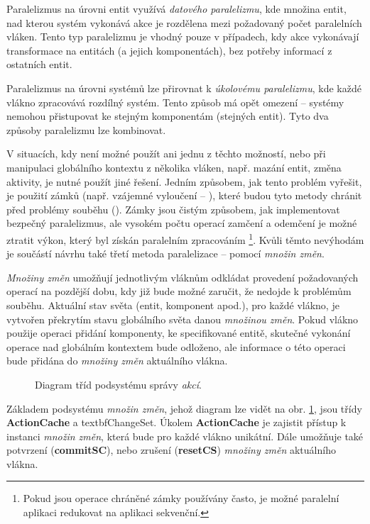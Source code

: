 Paralelizmus na úrovni entit využívá \emph{datového paralelizmu}, kde množina entit, nad kterou systém vykonává akce je rozdělena mezi požadovaný počet paralelních vláken. Tento typ paralelizmu je vhodný pouze v případech, kdy akce vykonávají transformace na entitách (a jejich komponentách), bez potřeby informací z ostatních entit. 

Paralelizmus na úrovni systémů lze přirovnat k \emph{úkolovému paralelizmu}, kde každé vlákno zpracovává rozdílný systém. Tento způsob má opět omezení -- systémy nemohou přistupovat ke stejným komponentám (stejných entit). Tyto dva způsoby paralelizmu lze kombinovat.

V situacích, kdy není možné použít ani jednu z těchto možností, nebo při manipulaci globálního kontextu z několika vláken, např. mazání entit, změna aktivity, je nutné použít jiné řešení. Jedním způsobem, jak tento problém vyřešit, je použití zámků (např. vzájemné vyloučení -- ), které budou tyto metody chránit před problémy souběhu (). Zámky jsou čistým způsobem, jak implementovat bezpečný paralelizmus, ale vysokém počtu operací zamčení a odemčení je možné ztratit výkon, který byl získán paralelním zpracováním \footnote{Pokud jsou operace chráněné zámky používány často, je možné paralelní aplikaci redukovat na aplikaci sekvenční.}. Kvůli těmto nevýhodám je součástí návrhu také třetí metoda paralelizace -- pomocí \emph{množin změn}.

\emph{Množiny změn} umožňují jednotlivým vláknům odkládat provedení požadovaných operací na pozdější dobu, kdy již bude možné zaručit, že nedojde k problémům souběhu. Aktuální stav světa (entit, komponent apod.), pro každé vlákno, je vytvořen překrytím stavu globálního světa danou \emph{množinou změn}. Pokud vlákno použije operaci přidání komponenty, ke specifikované entitě, skutečné vykonání operace nad globálním kontextem bude odloženo, ale informace o této operaci bude přidána do \emph{množiny změn} aktuálního vlákna.

\begin{figure}[H]
	\caption{Diagram tříd podsystému správy \emph{akcí}.}
	\label{Fig:DESActionDiag}
\end{figure}

Základem podsystému \emph{množin změn}, jehož diagram lze vidět na obr. \ref{Fig:DESActionDiag}, jsou třídy \textbf{ActionCache} a textbf{ChangeSet}. Úkolem \textbf{ActionCache} je zajistit přístup k instanci \emph{množin změn}, která bude pro každé vlákno unikátní. Dále umožňuje také potvrzení (\textbf{commitSC}), nebo zrušení (\textbf{resetCS}) \emph{množiny změn} aktuálního vlákna. 

